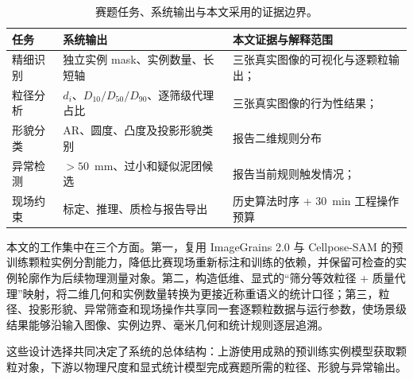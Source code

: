 \begin{table}[t]
\centering
\caption{赛题任务、系统输出与本文采用的证据边界。}
\label{tab:r-task-map}
\footnotesize
\renewcommand{\arraystretch}{1.12}
\begin{tabular}{>{\raggedright\arraybackslash}p{2.0cm}>{\raggedright\arraybackslash}p{5.2cm}>{\raggedright\arraybackslash}p{6.2cm}}
\toprule
任务 & 系统输出 & 本文证据与解释范围 \\
\midrule
精细识别 & 独立实例 mask、实例数量、长短轴 & 三张真实图像的可视化与逐颗粒输出；\\
粒径分析 & $d_i$、$D_{10}/D_{50}/D_{90}$、逐筛级代理占比 & 三张真实图像的行为性结果；\\
形貌分类 & AR、圆度、凸度及投影形貌类别 & 报告二维规则分布 \\
异常检测 & $>50$~mm、过小和疑似泥团候选 & 报告当前规则触发情况；\\
现场约束 & 标定、推理、质检与报告导出 & 历史算法时序 + 30~min 工程操作预算 \\
\bottomrule
\end{tabular}
\end{table}

本文的工作集中在三个方面。第一，复用 ImageGrains 2.0\cite{mair2026imagegrains2} 与 Cellpose-SAM\cite{pachitariu2025cellposeSAM} 的预训练颗粒实例分割能力，降低比赛现场重新标注和训练的依赖，并保留可检查的实例轮廓作为后续物理测量对象。第二，构造低维、显式的“筛分等效粒径 + 质量代理”映射，将二维几何和实例数量转换为更接近称重语义的统计口径；第三，粒径、投影形貌、异常筛查和现场操作共享同一套逐颗粒数据与运行参数，使场景级结果能够沿输入图像、实例边界、毫米几何和统计规则逐层追溯。

这些设计选择共同决定了系统的总体结构：上游使用成熟的预训练实例模型获取颗粒对象，下游以物理尺度和显式统计模型完成赛题所需的粒径、形貌与异常输出。
